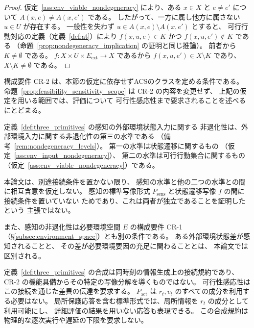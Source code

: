 \begin{proof}
仮定~\ref{ass:env_viable_nondegeneracy} により、ある $x\in X$ と
$e\neq e'$ について $A(x,e)\neq A(x,e')$ である。
したがって、一方に属し他方に属さない $u\in U$ が存在する。
一般性を失わず $u\in A(x,e)\setminus A(x,e')$ とすると、
可行行動対応の定義（定義~\ref{def:at}）により
$f(x,u,e)\in K$ かつ $f(x,u,e')\notin K$ である
（命題~\ref{prop:nondegeneracy_implication} の証明と同じ推論）。
前者から $K\neq\emptyset$ である。
$f:X\times U\times E_{\mathrm{ext}}\to X$ であるから
$f(x,u,e')\in X\setminus K$ であり、$X\setminus K\neq\emptyset$ である。
\end{proof}

構成要件 CR-2 は、本節の仮定に依存せずACSのクラスを定める条件である。
命題~\ref{prop:feasibility_sensitivity_scope} は CR-2 の内容を変更せず、
上記の仮定を用いる範囲では、評価について
可行性感応性まで要求されることを述べるにとどまる。

\begin{remark}[感知の非退化性と他の水準との関係]
\label{rem:sensing_nondegeneracy_relation}
定義~\ref{def:three_primitives} の感知の外部環境状態入力に関する
非退化性は、外部環境入力に関する非退化性の第三の水準である
（備考~\ref{rem:nondegeneracy_levels}）。
第一の水準は状態遷移に関するもの
（仮定~\ref{ass:env_input_nondegeneracy}）、
第二の水準は可行行動集合に関するもの
（仮定~\ref{ass:env_viable_nondegeneracy}）である。

本論文は、別途接続条件を置かない限り、
感知の水準と他の二つの水準との間に相互含意を仮定しない。
感知の標準写像形式 $P_{\mathrm{sens}}$ と状態遷移写像 $f$ の間に接続条件を置いていない
ためであり、これは両者が独立であることを証明したという
主張ではない。

また、感知の非退化性は必要環境空間 $E$ の構成要件 CR-1
（\S\ref{subsec:environment_space}）とも別の条件である。
ある外部環境状態差が感知されることと、
その差が必要環境要因の充足に関わることとは、
本論文では区別される。
\end{remark}

\begin{remark}[原始的な機能の標準写像形式の作動依存]
\label{rem:P_dependency}
定義~\ref{def:three_primitives} の合成は同時刻の情報生成上の接続規約であり、
CR-2 の機能具備からその特定の写像分解を導くものではない。
可行性感応性はこの接続を通じた差異の伝達を要求する。
$P_{\mathrm{act}}$ は $r_t,v_t$ のすべての成分を利用する必要はない。
局所保護応答を含む標準形式では、局所情報を $r_t$ の成分として利用可能にし、
詳細評価の結果を用いない応答も表現できる。
この合成規約は物理的な逐次実行や遅延の下限を要求しない。
\end{remark}

